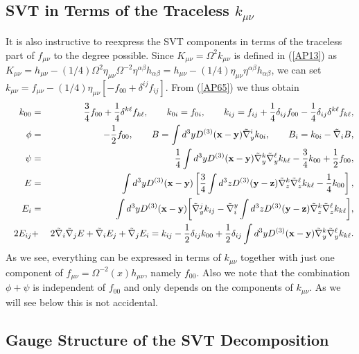 \documentclass[aps]{revtex4}
\begin{document}
\subsection{SVT in Terms of the Traceless $k_{\mu\nu}$}


It is also instructive to reexpress the SVT components in terms of the traceless part of $f_{\mu\nu}$ to the degree possible. Since $K_{\mu\nu}=\Omega^2k_{\mu\nu}$ is defined in (\ref{AP13}) as $K_{\mu\nu}=h_{\mu\nu}-(1/4)\Omega^2\eta_{\mu\nu}\Omega^{-2}\eta^{\alpha\beta}h_{\alpha\beta}=h_{\mu\nu}-(1/4)\eta_{\mu\nu}\eta^{\alpha\beta}h_{\alpha\beta}$, we can set $k_{\mu\nu}=f_{\mu\nu}-(1/4)\eta_{\mu\nu}[-f_{00}+\delta^{ij}f_{ij}]$. From (\ref{AP65}) we thus obtain
%
\begin{eqnarray}
k_{00}&=&\frac{3}{4}f_{00}+\frac{1}{4}\delta^{k\ell}f_{k\ell},\qquad k_{0i}=f_{0i},\qquad k_{ij}=f_{ij}+\frac{1}{4}\delta_{ij}f_{00}-\frac{1}{4}\delta_{ij}\delta^{k\ell}f_{k\ell},
\nonumber\\
\phi&=&-\frac{1}{2}f_{00},\qquad
B=\int d^3yD^{(3)}(\mathbf{x}-\mathbf{y})\tilde{\nabla}_y^ik_{0i},\qquad B_i=k_{0i}-\tilde{\nabla}_iB,
\nonumber\\
\psi&=&\frac{1}{4}\int d^3yD^{(3)}(\mathbf{x}-\mathbf{y})\tilde{\nabla}_y^k\tilde{\nabla}_y^{\ell}k_{k\ell}-\frac{3}{4}k_{00}+\frac{1}{2}f_{00},
\nonumber\\
\qquad
E&=&\int d^3yD^{(3)}(\mathbf{x}-\mathbf{y})\left[\frac{3}{4}\int d^3zD^{(3)}(\mathbf{y}-\mathbf{z})\tilde{\nabla}_z^k\tilde{\nabla}_z^{\ell}k_{k\ell}-\frac{1}{4}k_{00}\right],
\nonumber\\
E_i&=&\int d^3yD^{(3)}(\mathbf{x}-\mathbf{y})\bigg{[}\tilde{\nabla}_y^jk_{ij}
-\tilde{\nabla}^y_i\int d^3zD^{(3)}(\mathbf{y}-\mathbf{z})\tilde{\nabla}_z^k\tilde{\nabla}_z^{\ell}k_{k\ell}\bigg{]},
\nonumber\\
2E_{ij}&+&2\tilde{\nabla}_i\tilde{\nabla}_j E +\tilde{\nabla}_i E_j +\tilde{\nabla}_j E_i
=k_{ij}-\frac{1}{2}\delta_{ij}k_{00}+\frac{1}{2}\delta_{ij}\int d^3yD^{(3)}(\mathbf{x}-\mathbf{y})\tilde{\nabla}_y^k\tilde{\nabla}_y^{\ell}k_{k\ell}.
\label{AP66}
\end{eqnarray}
%
As we see, everything can be expressed in terms of $k_{\mu\nu}$ together with  just one component of $f_{\mu\nu}=\Omega^{-2}(x)h_{\mu\nu}$, namely $f_{00}$.  Also we note that the combination $\phi+\psi$ is independent of $f_{00}$ and only depends on the components of $k_{\mu\nu}$. As we will see below this is not accidental.

\subsection{Gauge Structure of the SVT Decomposition}
\end{document}
